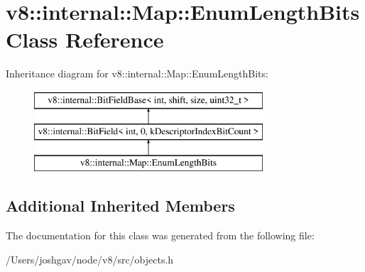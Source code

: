 \hypertarget{classv8_1_1internal_1_1_map_1_1_enum_length_bits}{}\section{v8\+:\+:internal\+:\+:Map\+:\+:Enum\+Length\+Bits Class Reference}
\label{classv8_1_1internal_1_1_map_1_1_enum_length_bits}
Inheritance diagram for v8\+:\+:internal\+:\+:Map\+:\+:Enum\+Length\+Bits\+:\begin{figure}[H]
\begin{center}
\leavevmode
\includegraphics[height=3.000000cm]{classv8_1_1internal_1_1_map_1_1_enum_length_bits}
\end{center}
\end{figure}
\subsection*{Additional Inherited Members}


The documentation for this class was generated from the following file\+:\begin{DoxyCompactItemize}
\item 
/\+Users/joshgav/node/v8/src/objects.\+h\end{DoxyCompactItemize}
